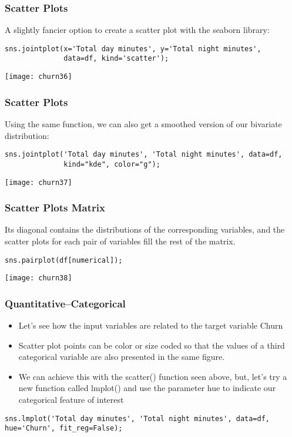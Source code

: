 \begin{frame}[fragile]\frametitle{Scatter Plots}
A slightly fancier option to create a scatter plot with the seaborn library:
 \begin{lstlisting}
sns.jointplot(x='Total day minutes', y='Total night minutes', 
              data=df, kind='scatter');
\end{lstlisting}
\begin{center}
\texttt{[image: churn36]}
\end{center}
\end{frame}


\begin{frame}[fragile]\frametitle{Scatter Plots}
Using the same function, we can also get a smoothed version of our bivariate distribution:
 \begin{lstlisting}
sns.jointplot('Total day minutes', 'Total night minutes', data=df,
              kind="kde", color="g");
\end{lstlisting}
\begin{center}
\texttt{[image: churn37]}
\end{center}
\end{frame}

\begin{frame}[fragile]\frametitle{Scatter Plots Matrix}
Its diagonal contains the distributions of the corresponding variables, and the scatter plots for each pair of variables fill the rest of the matrix.
 \begin{lstlisting}
sns.pairplot(df[numerical]);
\end{lstlisting}
\begin{center}
\texttt{[image: churn38]}
\end{center}
\end{frame}

\begin{frame}[fragile]\frametitle{Quantitative–Categorical}
\begin{itemize}
\item  Let's see how the input variables are related to the target variable Churn
\item Scatter plot points can be color or size coded so that the values of a third categorical variable are also presented in the same figure. 
\item We can achieve this with the scatter() function seen above, but, let's try a new function called lmplot() and use the parameter hue to indicate our categorical feature of interest
\end{itemize}
 \begin{lstlisting}
sns.lmplot('Total day minutes', 'Total night minutes', data=df, hue='Churn', fit_reg=False);
\end{lstlisting}
\end{frame}

